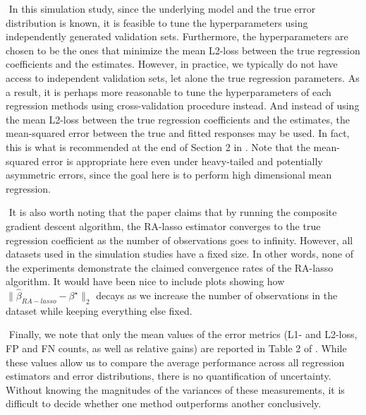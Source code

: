 $ $\newline
In this simulation study, since the underlying model and the true error distribution is known, it is feasible to tune the hyperparameters using independently generated validation sets. Furthermore, the hyperparameters are chosen to be the ones that minimize the mean L2-loss between the true regression coefficients and the estimates. However, in practice, we typically do not have access to independent validation sets, let alone the true regression parameters. As a result, it is perhaps more reasonable to tune the hyperparameters of each regression methods using cross-validation procedure instead. And instead of using the mean L2-loss between the true regression coefficients and the estimates, the mean-squared error between the true and fitted responses may be used. In fact, this is what is recommended at the end of Section 2 in \citet{fan2017estimation}. Note that the mean-squared error is appropriate here even under heavy-tailed and potentially asymmetric errors, since the goal here is to perform high dimensional mean regression.

$ $\newline
It is also worth noting that the paper claims that by running the composite gradient descent algorithm, the RA-lasso estimator converges to the true regression coefficient as the number of observations goes to infinity. However, all datasets used in the simulation studies have a fixed size. In other words, none of the experiments demonstrate the claimed convergence rates of the RA-lasso algorithm. It would have been nice to include plots showing how $\| \hat{\beta}_{RA-lasso} - \beta^\star \|_2$ decays as we increase the number of observations in the dataset while keeping everything else fixed.

$ $\newline
Finally, we note that only the mean values of the error metrics (L1- and L2-loss, FP and FN counts, as well as relative gains) are reported in Table 2 of \citet{fan2017estimation}. While these values allow us to compare the average performance across all regression estimators and error distributions, there is no quantification of uncertainty. Without knowing the magnitudes of the variances of these measurements, it is difficult to decide whether one method outperforms another conclusively.